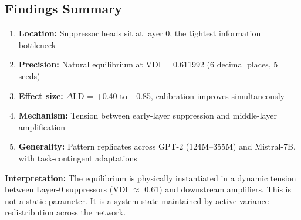 \subsection{Findings Summary}

\begin{enumerate}
\item \textbf{Location:} Suppressor heads sit at layer 0, the tightest information bottleneck
\item \textbf{Precision:} Natural equilibrium at VDI = 0.611992 (6 decimal places, 5 seeds)
\item \textbf{Effect size:} $\Delta$LD = +0.40 to +0.85, calibration improves simultaneously
\item \textbf{Mechanism:} Tension between early-layer suppression and middle-layer amplification
\item \textbf{Generality:} Pattern replicates across GPT-2 (124M--355M) and Mistral-7B, with task-contingent adaptations
\end{enumerate}

\textbf{Interpretation:} The equilibrium is physically instantiated in a dynamic tension between Layer-0 suppressors (VDI $\approx$ 0.61) and downstream amplifiers. This is not a static parameter. It is a system state maintained by active variance redistribution across the network.
